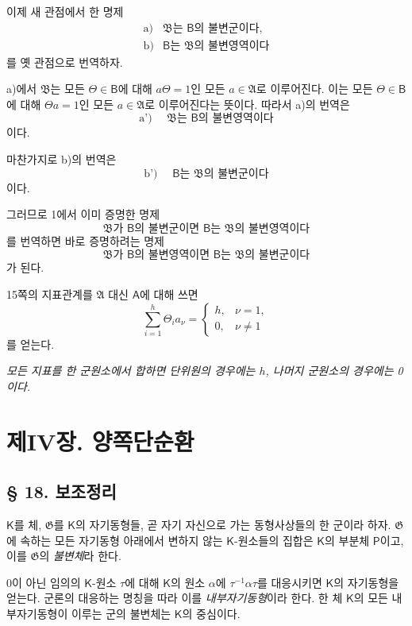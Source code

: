 이제 새 관점에서 한 명제
\[
\begin{array}{ll}
\text{a)}&\mathfrak B\text{는 }\mathsf B\text{의 불변군이다},\\
\text{b)}&\mathsf B\text{는 }\mathfrak B\text{의 불변영역이다}
\end{array}
\]
를 옛 관점으로 번역하자.

a)에서 \(\mathfrak B\)는 모든 \(\Theta\in\mathsf B\)에 대해 \(a\Theta=1\)인 모든 \(a\in\mathfrak A\)로 이루어진다. 이는 모든 \(\Theta\in\mathsf B\)에 대해 \(\Theta a=1\)인 모든 \(a\in\mathfrak A\)로 이루어진다는 뜻이다. 따라서 a)의 번역은
\[
        \text{a') }\quad
        \mathfrak B\text{는 }\mathsf B\text{의 불변영역이다}
\]
이다.

마찬가지로 b)의 번역은
\[
        \text{b') }\quad
        \mathsf B\text{는 }\mathfrak B\text{의 불변군이다}
\]
이다.

그러므로 1에서 이미 증명한 명제
\[
\mathfrak B\text{가 }\mathsf B\text{의 불변군이면 }
\mathsf B\text{는 }\mathfrak B\text{의 불변영역이다}
\]
를 번역하면 바로 증명하려는 명제
\[
\mathfrak B\text{가 }\mathsf B\text{의 불변영역이면 }
\mathsf B\text{는 }\mathfrak B\text{의 불변군이다}
\]
가 된다.

15쪽의 지표관계를 \(\mathfrak A\) 대신 \(\mathsf A\)에 대해 쓰면
\[
        \sum_{i=1}^{h}\Theta_i a_\nu
        =\begin{cases}
          h,&\nu=1,\\
          0,&\nu\ne1
        \end{cases}
\]
를 얻는다.

\emph{모든 지표를 한 군원소에서 합하면 단위원의 경우에는 \(h\), 나머지 군원소의 경우에는 0이다.}

\section*{제IV장. 양쪽단순환}

\subsection*{§ 18. 보조정리}

\(\mathsf K\)를 체, \(\mathfrak G\)를 \(\mathsf K\)의 자기동형들, 곧 자기 자신으로 가는 동형사상들의 한 군이라 하자. \(\mathfrak G\)에 속하는 모든 자기동형 아래에서 변하지 않는 \(\mathsf K\)-원소들의 집합은 \(\mathsf K\)의 부분체 \(\mathsf P\)이고, 이를 \(\mathfrak G\)의 \emph{불변체}라 한다.

0이 아닌 임의의 \(\mathsf K\)-원소 \(\tau\)에 대해 \(\mathsf K\)의 원소 \(\alpha\)에 \(\tau^{-1}\alpha\tau\)를 대응시키면 \(\mathsf K\)의 자기동형을 얻는다. 군론의 대응하는 명칭을 따라 이를 \emph{내부자기동형}이라 한다. 한 체 \(\mathsf K\)의 모든 내부자기동형이 이루는 군의 불변체는 \(\mathsf K\)의 중심이다.

